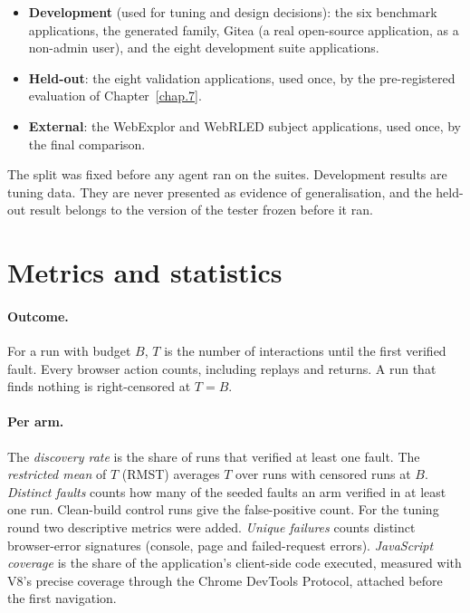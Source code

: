 \begin{itemize}
  \item \textbf{Development} (used for tuning and design decisions): the six benchmark
        applications, the generated family, Gitea (a real open-source application, as a
        non-admin user), and the eight development suite applications.
  \item \textbf{Held-out}: the eight validation applications, used once, by the
        pre-registered evaluation of Chapter~\ref{chap.7}.
  \item \textbf{External}: the WebExplor and WebRLED subject applications, used once, by
        the final comparison.
\end{itemize}

The split was fixed before any agent ran on the suites. Development results are tuning data.
They are never presented as evidence of generalisation, and the held-out result belongs to
the version of the tester frozen before it ran.

\section{Metrics and statistics}
\label{sec:stats}

\paragraph{Outcome.} For a run with budget $B$, $T$ is the number of interactions until the
first verified fault. Every browser action counts, including replays and returns. A run that
finds nothing is right-censored at $T = B$.

\paragraph{Per arm.} The \emph{discovery rate} is the share of runs that verified at least
one fault. The \emph{restricted mean} of $T$ (RMST) averages $T$
over runs with censored runs at $B$. \emph{Distinct faults} counts how many of the seeded
faults an arm verified in at least one run. Clean-build control runs give the false-positive
count. For the tuning round two descriptive metrics were added. \emph{Unique failures} counts
distinct browser-error signatures (console, page and failed-request errors). \emph{JavaScript
coverage} is the share of the application's client-side code executed, measured with V8's
precise coverage through the Chrome DevTools Protocol, attached before the first navigation.

